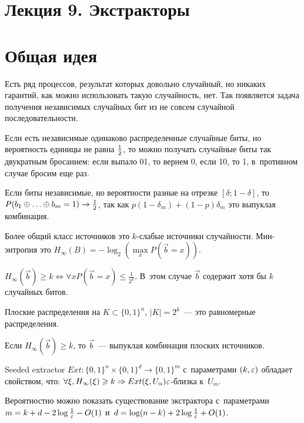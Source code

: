 \documentclass{article}
\begin{document}
\section*{Лекция 9. Экстракторы}
\resetcntrs

\section{Общая идея}

Есть ряд процессов, результат которых довольно случайный, но никаких
гарантий, как можно использовать такую случайность, нет. Так появляется задача
получения независимых случайных бит из не совсем случайной последовательности.

\begin{example}
	Если есть независимые одинаково распределенные случайные биты, но вероятность
	единицы не равна $1\over2$, то можно получать случайные биты так двукратным
	бросанием: если выпало 01, то вернем 0, если 10, то 1, в~противном случае
	бросим еще раз.

	Если биты независимые, но вероятности разные на отрезке $[\delta; 1 -
	\delta]$, то $P(b_1 \oplus \ldots \oplus b_m = 1) \rightarrow {1\over2}$, так
	как $p(1 - \delta_m) + (1 - p)\delta_m$ это выпуклая комбинация.
\end{example}

Более общий класс источников это $k$-слабые источники случайности. Мин-энтропия
это $H_\infty(B) = -\log_2\left( \max\limits_x P(\vec b = x)\right)$.

$H_\infty(\vec b) \ge k \Leftrightarrow \forall x P(\vec b = x) \le
\frac{1}{2^k}$. В~этом случае $\vec b$ содержит хотя бы $k$ случайных битов.

Плоские распределения на $K \subset \{0, 1\}^n$, $|K| = 2^k$~--- это равномерные
распределения.

\begin{theorem}
	Если $H_\infty(\vec b) \ge k$, то $\vec b$~--- выпуклая комбинация плоских
	источников.
\end{theorem}

\begin{definition}
	Seeded extractor $Ext: \{0, 1\}^n \times \{0, 1\}^d \rightarrow \{0, 1\}^m$
	с~параметрами $(k, \varepsilon)$ обладает свойством, что: $\forall\xi, H_\infty(\xi)
	\geqslant k \Rightarrow Ext(\xi, U_\alpha) \varepsilon$-близка к~$U_m$.
\end{definition}
Вероятностно можно показать существование экстрактора с~параметрами $m = k + d -
2\log \frac{1}{\varepsilon} - O(1)$ и~$d = \log(n - k) + 2\log\frac{1}{\varepsilon} + O(1)$.
\end{document}
